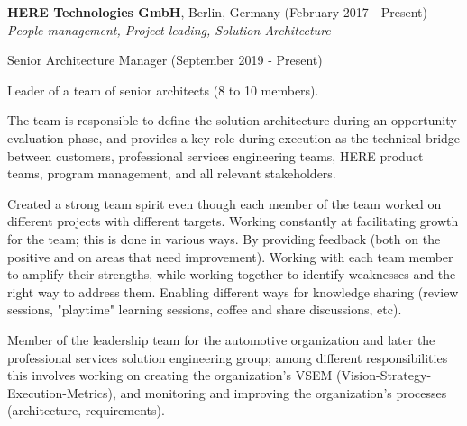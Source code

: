 \documentclass[alan.tex]{subfiles}
\begin{document}
  \item \textbf{HERE Technologies GmbH}, Berlin, Germany (February 2017 - Present)\\
    \emph{People management, Project leading, Solution Architecture}
    \begin{my_desc}
    \item[Senior Architecture Manager] (September 2019 - Present)
    \begin{my_bullets}
    \item Leader of a team of senior architects (8 to 10 members).
      \begin{my_bullets}
      \item The team is responsible to define the solution architecture during an opportunity evaluation phase, and provides a key role during execution as the technical bridge between customers, professional services engineering teams, HERE product teams, program management, and all relevant stakeholders.
      \item Created a strong team spirit even though each member of the team worked on different projects with different targets. Working constantly at facilitating growth for the team; this is done in various ways.  By providing feedback (both on the positive and on areas that need improvement). Working with each team member to amplify their strengths, while working together to identify weaknesses and the right way to address them. Enabling different ways for knowledge sharing (review sessions, "playtime" learning sessions, coffee and share discussions, etc).
    \end{my_bullets}
    \item Member of the leadership team for the automotive organization and later the professional services solution engineering group; among different responsibilities this involves working on creating the organization's VSEM (Vision-Strategy-Execution-Metrics), and monitoring and improving the organization's processes (architecture, requirements).


\end{my_bullets}
\end{my_desc}
\end{document}
